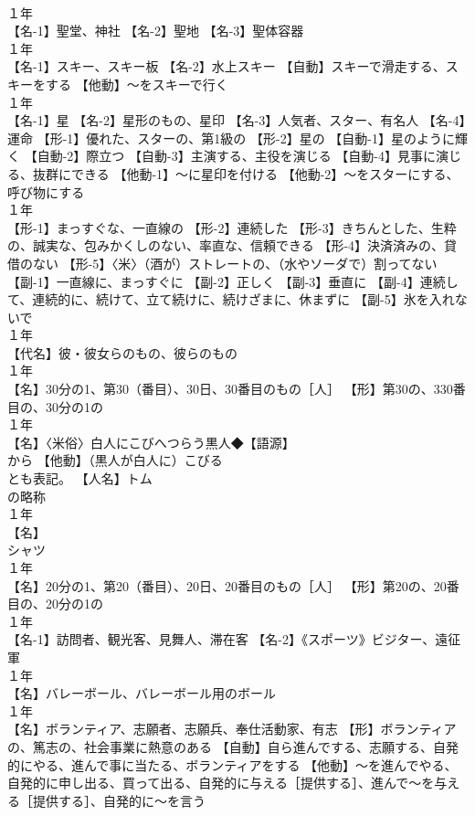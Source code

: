 \documentclass[8pt]{extreport}
\begin{document}
\begin{CJK}{UTF8}{min}
\\	１年	
\\	【名-1】聖堂、神社 【名-2】聖地 【名-3】聖体容器
\\	１年	
\\	【名-1】スキー、スキー板 【名-2】水上スキー 【自動】スキーで滑走する、スキーをする 【他動】～をスキーで行く
\\	１年	
\\	【名-1】星 【名-2】星形のもの、星印 【名-3】人気者、スター、有名人 【名-4】運命 【形-1】優れた、スターの、第1級の 【形-2】星の 【自動-1】星のように輝く 【自動-2】際立つ 【自動-3】主演する、主役を演じる 【自動-4】見事に演じる、抜群にできる 【他動-1】～に星印を付ける 【他動-2】～をスターにする、呼び物にする
\\	１年	
\\	【形-1】まっすぐな、一直線の 【形-2】連続した 【形-3】きちんとした、生粋の、誠実な、包みかくしのない、率直な、信頼できる 【形-4】決済済みの、貸借のない 【形-5】〈米〉（酒が）ストレートの、（水やソーダで）割ってない 【副-1】一直線に、まっすぐに 【副-2】正しく 【副-3】垂直に 【副-4】連続して、連続的に、続けて、立て続けに、続けざまに、休まずに 【副-5】氷を入れないで
\\	１年	
\\	【代名】彼・彼女らのもの、彼らのもの
\\	１年	
\\	【名】30分の1、第30（番目）、30日、30番目のもの［人］ 【形】第30の、330番目の、30分の1の
\\	１年	
\\	【名】〈米俗〉白人にこびへつらう黒人◆【語源】
\\	から 【他動】（黒人が白人に）こびる
\\	とも表記。 【人名】トム
\\	の略称
\\	１年	
\\	【名】
\\	シャツ
\\	１年	
\\	【名】20分の1、第20（番目）、20日、20番目のもの［人］ 【形】第20の、20番目の、20分の1の
\\	１年	
\\	【名-1】訪問者、観光客、見舞人、滞在客 【名-2】《スポーツ》ビジター、遠征軍
\\	１年	
\\	【名】バレーボール、バレーボール用のボール
\\	１年	
\\	【名】ボランティア、志願者、志願兵、奉仕活動家、有志 【形】ボランティアの、篤志の、社会事業に熱意のある 【自動】自ら進んでする、志願する、自発的にやる、進んで事に当たる、ボランティアをする 【他動】～を進んでやる、自発的に申し出る、買って出る、自発的に与える［提供する］、進んで～を与える［提供する］、自発的に～を言う

\end{CJK}
\end{document}
